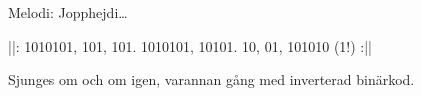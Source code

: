 \begin{song}
\begin{songmeta}
Melodi: Jopphejdi\ldots
\end{songmeta}
\begin{songtext}
||: 1010101,
101, 101.
1010101,
10101.
10, 01,
101010 (1!) :||
\end{songtext}
\begin{songnotes}
Sjunges om och om igen, varannan gång med inverterad binärkod.
\end{songnotes}
\end{song}

